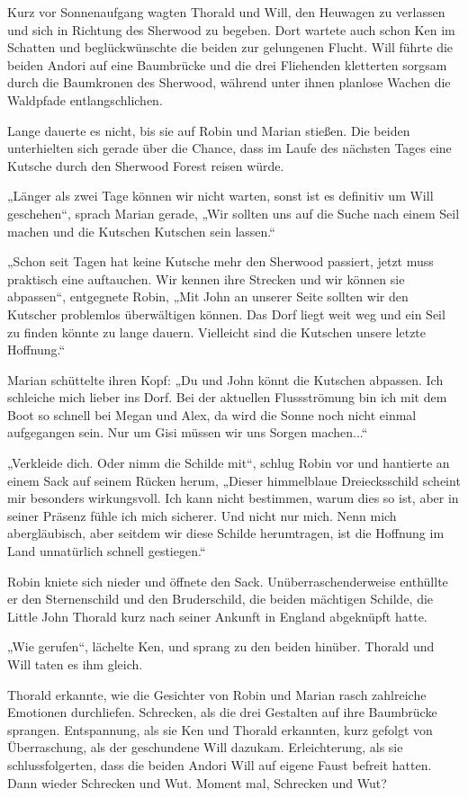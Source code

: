 \documentclass[10pt, a4paper, oneside]{book}
\begin{document}
Kurz vor Sonnenaufgang wagten Thorald und Will, den Heuwagen zu verlassen und sich in Richtung des Sherwood zu begeben. Dort wartete auch schon Ken im Schatten und beglückwünschte die beiden zur gelungenen Flucht. Will führte die beiden Andori auf eine Baumbrücke und die drei Fliehenden kletterten sorgsam durch die Baumkronen des Sherwood, während unter ihnen planlose Wachen die Waldpfade entlangschlichen.

Lange dauerte es nicht, bis sie auf Robin und Marian stießen. Die beiden unterhielten sich gerade über die Chance, dass im Laufe des nächsten Tages eine Kutsche durch den Sherwood Forest reisen würde.

„Länger als zwei Tage können wir nicht warten, sonst ist es definitiv um Will geschehen“, sprach Marian gerade, „Wir sollten uns auf die Suche nach einem Seil machen und die Kutschen Kutschen sein lassen.“

„Schon seit Tagen hat keine Kutsche mehr den Sherwood passiert, jetzt muss praktisch eine auftauchen. Wir kennen ihre Strecken und wir können sie abpassen“, entgegnete Robin, „Mit John an unserer Seite sollten wir den Kutscher problemlos überwältigen können. Das Dorf liegt weit weg und ein Seil zu finden könnte zu lange dauern. Vielleicht sind die Kutschen unsere letzte Hoffnung.“

Marian schüttelte ihren Kopf: „Du und John könnt die Kutschen abpassen. Ich schleiche mich lieber ins Dorf. Bei der aktuellen Flussströmung bin ich mit dem Boot so schnell bei Megan und Alex, da wird die Sonne noch nicht einmal aufgegangen sein. Nur um Gisi müssen wir uns Sorgen machen...“

„Verkleide dich. Oder nimm die Schilde mit“, schlug Robin vor und hantierte an einem Sack auf seinem Rücken herum, „Dieser himmelblaue Dreiecksschild scheint mir besonders wirkungsvoll. Ich kann nicht bestimmen, warum dies so ist, aber in seiner Präsenz fühle ich mich sicherer. Und nicht nur mich. Nenn mich abergläubisch, aber seitdem wir diese Schilde herumtragen, ist die Hoffnung im Land unnatürlich schnell gestiegen.“

Robin kniete sich nieder und öffnete den Sack. Unüberraschenderweise enthüllte er den Sternenschild und den Bruderschild, die beiden mächtigen Schilde, die Little John Thorald kurz nach seiner Ankunft in England abgeknüpft hatte.

„Wie gerufen“, lächelte Ken, und sprang zu den beiden hinüber. Thorald und Will taten es ihm gleich.

Thorald erkannte, wie die Gesichter von Robin und Marian rasch zahlreiche Emotionen durchliefen. Schrecken, als die drei Gestalten auf ihre Baumbrücke sprangen. Entspannung, als sie Ken und Thorald erkannten, kurz gefolgt von Überraschung, als der geschundene Will dazukam. Erleichterung, als sie schlussfolgerten, dass die beiden Andori Will auf eigene Faust befreit hatten. Dann wieder Schrecken und Wut. Moment mal, Schrecken und Wut?
\end{document}
